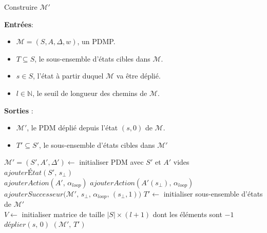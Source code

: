 \documentclass[12pt,a4paper]{report}
\theoremstyle{definition}%
\theoremstyle{remark}
\let\labelitemi\labelitemii
\begin{document}
\begin{algorithm}[H]
\caption{Construire $\mathcal{M}'$}
\hspace*{\algorithmicindent} \textbf{Entrées}:
	\begin{itemize}
		\renewcommand{\labelitemi}{\tiny$\bullet$}
		\item $\mathcal{M} = (S, A, \Delta, w)$, un PDMP.
		\item $T \subseteq S$, le sous-ensemble d'états cibles dans $\mathcal{M}$.
		\item $s \in S$, l'état à partir duquel $\mathcal{M}$ va être déplié.
		\item $l \in \mathbb{N}$, le seuil de longueur des chemins de
			$\mathcal{M}$.
	\end{itemize}
\hspace*{\algorithmicindent} \textbf{Sorties} :
	\begin{itemize}
	\renewcommand{\labelitemi}{\tiny$\bullet$}
	\item $\mathcal{M}'$, le PDM déplié depuis l'état $(s, 0)$ de $\mathcal{M}$.
	\item $T' \subseteq S'$, le sous-ensemble d'états cibles dans
		$\mathcal{M}'$
	\end{itemize}
\begin{algorithmic}[1]
\STATE $\mathcal{M}' = (S', A', \Delta') \gets$ initialiser PDM avec $S'$ et $A'$ vides \\
\STATE $ajouter\textit{\'E}tat(S', \, s_\bot)$\\
\STATE $ajouterAction(A', \, \alpha_{loop})$
\STATE $ajouterAction(A'(s_\bot), \, \alpha_{loop})$
\STATE $ajouterSuccesseur\big(\mathcal{M}', \, s_\bot, \, \alpha_{loop}, \,
	(s_\bot, 1)\big)$
\STATE $T' \gets$ initialiser sous-ensemble d'états de $\mathcal{M}'$\\
\STATE $V \gets$ initialiser matrice de taille $|S| \times (l + 1)$ dont les éléments sont $-1$
\STATE $\textit{déplier}(s,\, 0)$
\RETURN $(\mathcal{M}', \, T')$
\end{algorithmic}
\end{algorithm}
\end{document}
